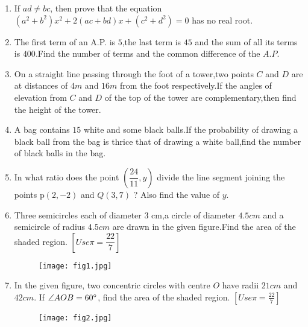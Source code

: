 \documentclass{article}
\providecommand{\brak}[1]{\ensuremath{\left(#1\right)}}
\providecommand{\sbrak}[1]{\ensuremath{\left[#1\right]}}
\begin{document}
\begin{enumerate}
																				        \item If $ad \neq bc$, then prove that the equation $\brak{a^2 + b^2}x^2 + 2\brak{ac +bd}x + \brak{c^2 + d^2} = 0 $ has no real root. 
																						    
																						    \item The first term of an A.P. is $5$,the last term is $45$ and the sum of all its terms is $400$.Find the number of terms and the common difference of the $A.P$.
																							        
																							        \item On a straight line passing through the foot of a tower,two points $C$ and $D$ are at distances of $4 m$ and $16 m$ from the foot respectively.If the angles of elevation from $C$ and $D$ of the top of the tower are complementary,then find the height of the tower.
																									    
																									    \item A bag contains $15$ white and some black balls.If the probability of drawing a black ball from the bag is thrice that of drawing a white ball,find the number of black balls in the bag.
																										        
																										        \item In what ratio does the point $\brak{\dfrac{24}{11},y}$ divide the line segment joining the points p$\brak{2,-2}$ and $Q\brak{3,7}$ ? Also find the value of $y$.
																												    
																												    \item Three semicircles each of diameter $3$ cm,a circle of diameter $4.5 cm$ and a semicircle of radius $4.5 cm$ are drawn in the given figure.Find the area of the shaded region. 
																													        \hfill $\sbrak {Use \pi = \dfrac{22}{7}}$
																														    \begin{figure}[h]
																															            \centering
																																            \texttt{[image: fig1.jpg]}
																																
																																		        \end{figure}

																																			    \item In the given figure, two concentric circles with centre $O$ have radii $21 cm$ and $42 cm$. If $\angle AOB = 60\degree$, find the area of the shaded region.
																																				        \hfill $\sbrak{Use \pi = \frac{22}{7}}$
																																					    \begin{figure}[h]
																																						            \centering
																																							            \texttt{[image: fig2.jpg]}
																																								        \end{figure}


\end{enumerate}
\end{document}
